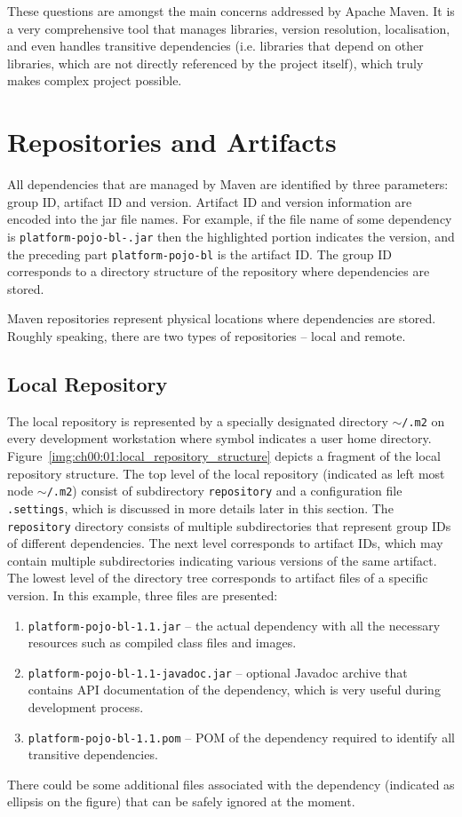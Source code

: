   These questions are amongst the main concerns addressed by Apache Maven.
  It is a very comprehensive tool that manages libraries, version resolution, localisation, and even handles transitive dependencies (i.e. libraries that depend on other libraries, which are not directly referenced by the project itself), which truly makes complex project possible.

  \section{Repositories and Artifacts}
  All dependencies that are managed by Maven are identified by three parameters: group ID, artifact ID and version.
  Artifact ID and version information are encoded into the jar file names.
  For example, if the file name of some dependency is \texttt{platform-pojo-bl-.jar} then the highlighted portion \texttt{} indicates the version, and the preceding part \texttt{platform-pojo-bl} is the artifact ID.
  The group ID corresponds to a directory structure of the repository where dependencies are stored.

  Maven repositories represent physical locations where dependencies are stored.
  Roughly speaking, there are two types of repositories -- local and remote.
  

  \subsection*{Local Repository}
  The local repository is represented by a specially designated directory \texttt{$\sim$/.m2} on every development workstation where symbol \tikzinline{$\sim$} indicates a user home directory.
  Figure~\ref{img:ch00:01:local_repository_structure} depicts a fragment of the local repository structure.
  The top level of the local repository (indicated as left most node \texttt{$\sim$/.m2}) consist of subdirectory \texttt{repository} and a configuration file \texttt{.settings}, which is discussed in more details later in this section.
  The \texttt{repository} directory consists of multiple subdirectories that represent group IDs of different dependencies.
  The next level corresponds to artifact IDs, which may contain multiple subdirectories indicating various versions of the same artifact.
  The lowest level of the directory tree corresponds to artifact files of a specific version.
  In this example, three files are presented:
  \begin{enumerate}
    \item \texttt{platform-pojo-bl-1.1.jar} -- the actual dependency with all the necessary resources such as compiled class files and images.
    \item \texttt{platform-pojo-bl-1.1-javadoc.jar} -- optional Javadoc archive that contains API documentation of the dependency, which is very useful during development process.
    \item \texttt{platform-pojo-bl-1.1.pom} -- POM of the dependency required to identify all transitive dependencies.
  \end{enumerate}
  There could be some additional files associated with the dependency (indicated as ellipsis on the figure) that can be safely ignored at the moment.

